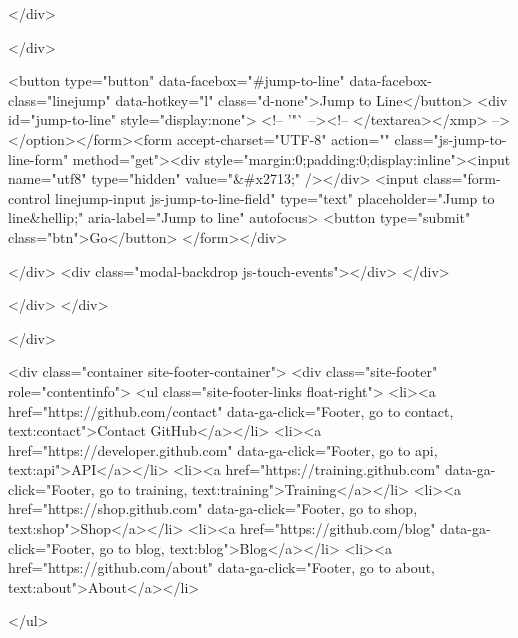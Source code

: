   </div>

</div>

<button type="button" data-facebox="#jump-to-line" data-facebox-class="linejump" data-hotkey="l" class="d-none">Jump to Line</button>
<div id="jump-to-line" style="display:none">
  <!-- '"` --><!-- </textarea></xmp> --></option></form><form accept-charset="UTF-8" action="" class="js-jump-to-line-form" method="get"><div style="margin:0;padding:0;display:inline"><input name="utf8" type="hidden" value="&#x2713;" /></div>
    <input class="form-control linejump-input js-jump-to-line-field" type="text" placeholder="Jump to line&hellip;" aria-label="Jump to line" autofocus>
    <button type="submit" class="btn">Go</button>
</form></div>


  </div>
  <div class="modal-backdrop js-touch-events"></div>
</div>

    </div>
  </div>

  </div>

      <div class="container site-footer-container">
  <div class="site-footer" role="contentinfo">
    <ul class="site-footer-links float-right">
        <li><a href="https://github.com/contact" data-ga-click="Footer, go to contact, text:contact">Contact GitHub</a></li>
      <li><a href="https://developer.github.com" data-ga-click="Footer, go to api, text:api">API</a></li>
      <li><a href="https://training.github.com" data-ga-click="Footer, go to training, text:training">Training</a></li>
      <li><a href="https://shop.github.com" data-ga-click="Footer, go to shop, text:shop">Shop</a></li>
        <li><a href="https://github.com/blog" data-ga-click="Footer, go to blog, text:blog">Blog</a></li>
        <li><a href="https://github.com/about" data-ga-click="Footer, go to about, text:about">About</a></li>

    </ul>

